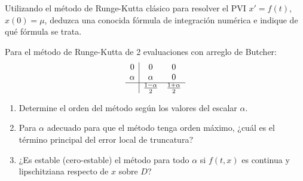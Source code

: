 \begin{ejercicio}\label{ej:3.1.9}
    Utilizando el método de Runge-Kutta clásico para resolver el PVI $x' = f(t)$, $x(0) = \mu$, deduzca una conocida fórmula de integración numérica e indique de qué fórmula se trata.
\end{ejercicio}

\begin{ejercicio}\label{ej:3.1.10}
    Para el método de Runge-Kutta de 2 evaluaciones con arreglo de Butcher:
    \begin{equation*}
        \begin{array}{c|cc}
            0 & 0 & 0 \\ 
            \alpha & \alpha & 0 \\ \hline
             & \frac{1-\alpha}{2} & \frac{1+\alpha}{2}
        \end{array}
    \end{equation*}
    \begin{enumerate}
        \item Determine el orden del método según los valores del escalar $\alpha$.
        \item Para $\alpha$ adecuado para que el método tenga orden máximo, ¿cuál es el término principal del error local de truncatura?
        \item ¿Es estable (cero-estable) el método para todo $\alpha$ si $f(t, x)$ es continua y lipschitziana respecto de $x$ sobre $D$?
    \end{enumerate}
\end{ejercicio}




